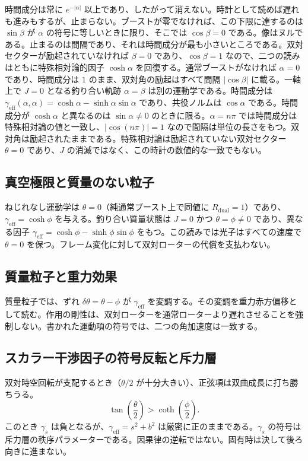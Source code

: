 \documentclass[a4paper]{article}
\begin{document}
時間成分は常に $e^{-|\alpha|}$ 以上であり、したがって消えない。時計として読めば遅れも進みもするが、止まらない。ブーストが零でなければ、この下限に達するのは $\sin\beta$ が $\alpha$ の符号に等しいときに限り、そこでは $\cos\beta=0$ である。像はヌルである。止まるのは間隔であり、それは時間成分が最も小さいところである。双対セクターが励起されていなければ $\beta=0$ であり、$\cos\beta=1$ なので、二つの読みはともに特殊相対論的因子 $\cosh\alpha$ を回復する。通常ブーストがなければ $\alpha=0$ であり、時間成分は $1$ のまま、双対角の励起はすべて間隔 $|\cos\beta|$ に載る。一軸上で $J=0$ となる釣り合い軌跡 $\alpha=\beta$ は別の運動学である。時間成分は $\gamma_{\mathrm{eff}}(\alpha,\alpha)=\cosh\alpha-\sinh\alpha\sin\alpha$ であり、共役ノルムは $\cos\alpha$ である。時間成分が $\cosh\alpha$ と異なるのは $\sin\alpha\neq 0$ のときに限る。$\alpha=n\pi$ では時間成分は特殊相対論の値と一致し、$|\cos(n\pi)|=1$ なので間隔は単位の長さをもつ。双対角は励起されたままである。特殊相対論は励起されていない双対セクター $\theta=0$ であり、$J$ の消滅ではなく、この時計の数値的な一致でもない。

\subsection{真空極限と質量のない粒子}

ねじれなし運動学は $\theta=0$（純通常ブースト上で同値に $R_{\mathrm{dual}}=1$）であり、$\gamma_{\mathrm{eff}}=\cosh\phi$ を与える。釣り合い質量状態は $J=0$ かつ $\theta=\phi\neq 0$ であり、異なる因子 $\gamma_{\mathrm{eff}}=\cosh\phi-\sinh\phi\sin\phi$ をもつ。この読みでは光子はすべての速度で $\theta=0$ を保つ。フレーム変化に対して双対ローターの代償を支払わない。

\subsection{質量粒子と重力効果}

質量粒子では、ずれ $\delta\theta = \theta - \phi$ が $\gamma_{\mathrm{eff}}$ を変調する。その変調を重力赤方偏移として読む。作用の剛性は、双対ローターを通常ローターより遅れさせることを強制しない。書かれた運動項の符号では、二つの角加速度は一致する。

\subsection{スカラー干渉因子の符号反転と斥力層}

双対時空回転が支配するとき（$\theta/2$ が十分大きい）、正弦項は双曲成長に打ち勝ちうる。
\[
\tan\left(\frac{\theta}{2}\right) > \coth\left(\frac{\phi}{2}\right).
\]
このとき $\gamma_s$ は負となるが、$\gamma_\text{eff}=s^2+b^2$ は厳密に正のままである。$\gamma_s$ の符号は斥力層の秩序パラメーターである。因果律の逆転ではない。固有時は決して後ろ向きに進まない。
\end{document}
